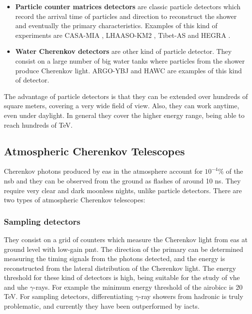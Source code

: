 \documentclass[main.tex]{subfiles}
\begin{document}
\begin{itemize}
    \item \textbf{Particle counter matrices detectors} are classic particle detectors which record the arrival time of particles and direction to reconstruct the shower and eventually the primary characteristics. Examples of this kind of experiments are CASA-MIA \cite{casamia}, LHAASO-KM2 \cite{2016LHAASO}, Tibet-AS \cite{1990TibetAs} and HEGRA \cite{FONSECA1992HEGRA}.\\
    \item \textbf{Water Cherenkov detectors} are other kind of particle detector. They consist on a large number of big water tanks where particles from the shower produce Cherenkov light. ARGO-YBJ \cite{2015Argo} and HAWC \cite{2014HAWC} are examples of this kind of detector.\\

\end{itemize}
The advantage of particle detectors is that they can be extended over hundreds of square meters, covering a very wide field of view. Also, they can work anytime, even under daylight. In general they cover the higher energy range, being able to reach hundreds of TeV.

\subsection{Atmospheric Cherenkov Telescopes}

Cherenkov photons produced by \gls{eas} in the atmosphere account for $10^{-4}$\% of the \gls{nsb} and they can be observed from the ground as flashes of around 10 ns. They require very clear and dark moonless nights, unlike particle detectors. There are two types of atmospheric Cherenkov telescopes:  

\subsubsection{Sampling detectors}

They consist on a grid of counters which measure the Cherenkov light from \gls{eas} at ground level with low-gain \gls{pmt}. The direction of the primary can be determined measuring the timing signals from the photons detected, and the energy is reconstructed from the lateral distribution of the Cherenkov light. The energy threshold for these kind of detectors is high, being suitable for the study of \gls{vhe} and \gls{uhe} $\gamma$-rays. For example the minimum energy threshold of the \gls{airobicc} is 20 TeV. For sampling detectors, differentiating $\gamma$-ray showers from hadronic is truly problematic, and currently they have been outperformed by \glspl{iact}. 
\end{document}
